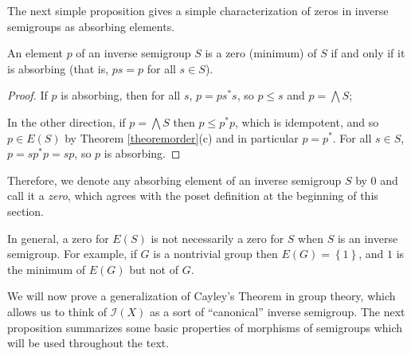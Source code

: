 
The next simple proposition gives a simple characterization of zeros in inverse semigroups as absorbing elements.

\begin{proposition}\label{propositionzerosemigroup}
An element $p$ of an inverse semigroup $S$ is a zero (minimum) of $S$ if and only if it is absorbing (that is, $ps=p$ for all $s\in S$).
\end{proposition}
\begin{proof}
If $p$ is absorbing, then for all $s$, $p=ps^*s$, so $p\leq s$ and $p=\bigwedge S$;

In the other direction, if $p=\bigwedge S$ then $p\leq p^*p$, which is idempotent, and so $p\in E(S)$ by Theorem \ref{theoremorder}(c) and in particular $p=p^*$. For all $s\in S$, $p=sp^*p=sp$, so $p$ is absorbing.\qedhere
\end{proof}

Therefore, we denote any absorbing element of an inverse semigroup $S$ by $0$ and call it a \emph{zero}, which agrees with the poset definition at the beginning of this section.

\begin{example}
In general, a zero for $E(S)$ is not necessarily a zero for $S$ when $S$ is an inverse semigroup. For example, if $G$ is a nontrivial group then $E(G)=\left\{1\right\}$, and $1$ is the minimum of $E(G)$ but not of $G$.
\end{example}

We will now prove a generalization of Cayley's Theorem in group theory, which allows us to think of $\mathcal{I}(X)$ as a sort of ``canonical'' inverse semigroup. The next proposition summarizes some basic properties of morphisms of semigroups which will be used throughout the text. 

